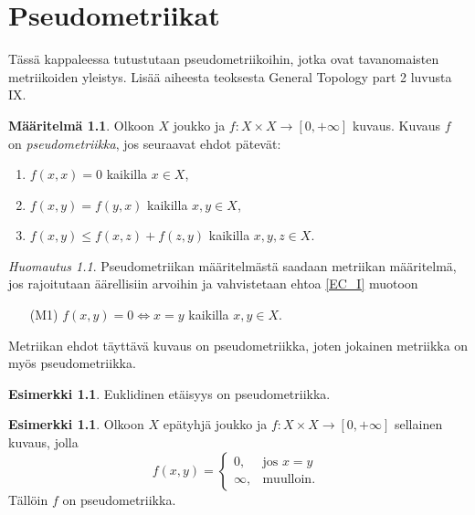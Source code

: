 \documentclass[12pt,a4paper,leqno]{report}
\theoremstyle{plain}
\theoremstyle{definition}
\newtheorem{maar}[equation]{Määritelmä}
\newtheorem{esim}[equation]{Esimerkki}
\theoremstyle{remark}
\newtheorem{huom}[equation]{Huomautus}
\begin{document}
\chapter{Pseudometriikat}
Tässä kappaleessa tutustutaan pseudometriikoihin, jotka ovat tavanomaisten metriikoiden yleistys. Lisää aiheesta teoksesta General Topology part 2 \cite{Eom2} luvusta IX.
\begin{maar}\label{pseudo_maar}
Olkoon $X$ joukko ja $f\colon X\times X\rightarrow [0,+\infty]$ 
kuvaus. Kuvaus $f$ on \emph{pseudometriikka}, jos seuraavat ehdot pätevät:
\begin{enumerate} [label=(P\arabic*),ref=(P\arabic*)]
\item\label{EC_I} $f(x,x)=0$ kaikilla $x\in X$,
\item\label{EC_II} $f(x,y)=f(y,x)$ kaikilla $x,y\in X$,
\item\label{EC_III} $f(x,y)\leq f(x,z)+f(z,y)$ kaikilla $x,y,z\in X$.
\end{enumerate}
\end{maar}
\begin{huom}
Pseudometriikan määritelmästä saadaan metriikan määritelmä, jos rajoitutaan äärellisiin arvoihin ja vahvistetaan ehtoa \ref{EC_I} muotoon 
\begin{enumerate} %
\item[(M1)]\label{M1} $f(x,y)=0\Leftrightarrow x=y$ kaikilla $x,y\in X.$
\end{enumerate}
Metriikan ehdot täyttävä kuvaus on pseudometriikka, 
joten %
jokainen metriikka on myös pseudometriikka.
\end{huom}
\begin{esim}%
Euklidinen etäisyys on pseudometriikka.
\end{esim}
\begin{esim}%
Olkoon $X$ epätyhjä joukko ja $f\colon X\times X\rightarrow [0,+\infty]$ sellainen kuvaus, jolla
\begin{equation*}
f(x,y) = \begin{cases} 0, & \mbox{jos } x=y\\
\infty, & \mbox{muulloin. } \end{cases}
\end{equation*}
Tällöin $f$ on pseudometriikka.
\end{esim}
\end{document}
